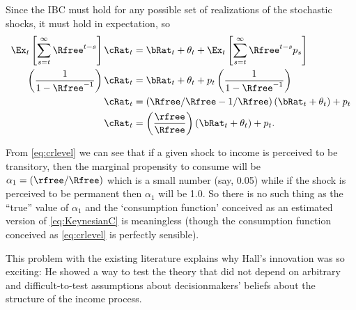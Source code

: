 \documentclass{handout}
\begin{document}
Since the IBC must hold for any possible set of realizations of the stochastic shocks,
it must hold in expectation, so 
\begin{equation}\begin{gathered}\begin{aligned}
      \Ex_{t}\left[\sum_{s=t}^{\infty} \Rfree^{t-s}\right] \cRat_{t} & =  \bRat_{t} + \theta_{t} + \Ex_{t}\left[\sum_{s=t}^{\infty} \Rfree^{t-s}p_{s}\right]
\\      \left(\frac{1}{1-\Rfree^{-1}}\right) \cRat_{t} & =  \bRat_{t}+\theta_{t}+p_{t}\left(\frac{1}{1-\Rfree^{-1}}\right)
\\  \cRat_{t} & =  \left(\Rfree/\Rfree - 1/\Rfree\right) (\bRat_{t}+\theta_{t}) + p_{t}
\\  \cRat_{t} & =  \left(\frac{\rfree}{\Rfree}\right) (\bRat_{t}+\theta_{t}) + p_{t}. \label{eq:crlevel}
\end{aligned}\end{gathered}\end{equation}

From \eqref{eq:crlevel} we can see that if a given shock to income is perceived 
to be transitory, then the marginal propensity to consume will be $\alpha_{1}=(\rfree/\Rfree)$ which is 
a small number (say, 0.05) while if 
the shock is perceived to be permanent then $\alpha_{1}$ will be 1.0.  So there is no such thing
as the ``true'' value of $\alpha_{1}$ and the `consumption function' conceived as an estimated version
of \eqref{eq:KeynesianC} is meaningless (though the consumption function conceived as \eqref{eq:crlevel} 
is perfectly sensible). 

This problem with the existing literature explains why Hall's
innovation was so exciting: He showed a way to test the theory that
did not depend on arbitrary and difficult-to-test assumptions about
decisionmakers' beliefs about the structure of the income process.


\end{document}

